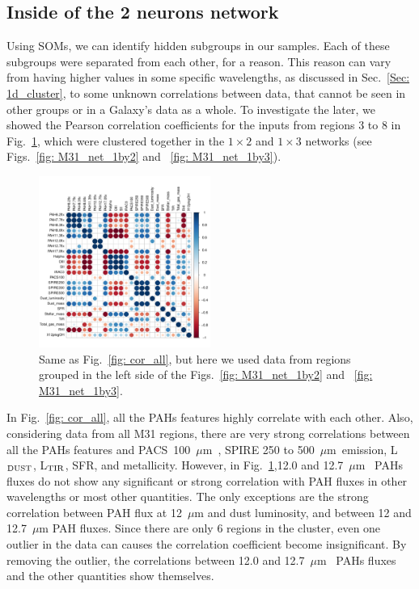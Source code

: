         
    \subsection{Inside of the 2 neurons network}%
        Using SOMs, we can identify hidden subgroups in our samples. 
        Each of these subgroups were separated from each other, for a reason.
        This reason can vary from having higher values in some specific wavelengths, as discussed in Sec.~\ref{Sec: 1d_cluster}, to some unknown correlations between data, that cannot be seen in other groups or in a Galaxy's data as a whole.
        To investigate the later, we showed the Pearson correlation coefficients for the inputs from regions 3 to 8 in Fig.~\ref{fig: cor_cluster1}, which were clustered together in the $1\times2$ and $1\times3$ networks (see Figs.~\ref{fig: M31_net_1by2} and ~\ref{fig: M31_net_1by3}).
        
        \begin{figure}
        \includegraphics[width=0.5\textwidth]{../images0.01/cor_plots/M31_derived_3_to_8_core_plot_for_paper.pdf}%
        \caption{Same as Fig.~\ref{fig: cor_all}, but here we used data from regions grouped in the left side of the Figs.~\ref{fig: M31_net_1by2} and ~\ref{fig: M31_net_1by3}. }
          \label{fig: cor_cluster1}
        \end{figure}
        
        In Fig.~\ref{fig: cor_all}, all the PAHs features highly correlate with each other. 
        Also, considering data from all M31 regions, there are very strong correlations between all the PAHs features and PACS~100~$\mu$m~, SPIRE 250 to 500~$\mu$m~emission, L$_{\rm DUST}$, L$_{\rm TIR}$, SFR, and metallicity.
        However, in Fig.~\ref{fig: cor_cluster1},12.0 and 12.7~$\mu$m~ PAHs fluxes do not show any significant or strong correlation with PAH fluxes in other wavelengths or most other quantities.
        The only exceptions are the strong correlation between PAH flux at 12~$\mu$m and dust luminosity, and between 12 and 12.7~$\mu$m PAH fluxes.
        Since there are only 6 regions in the cluster, even one outlier in the data can causes the correlation coefficient become insignificant.
        By removing the outlier, the correlations between 12.0 and 12.7~$\mu$m~ PAHs fluxes and the other quantities show themselves. 
        
